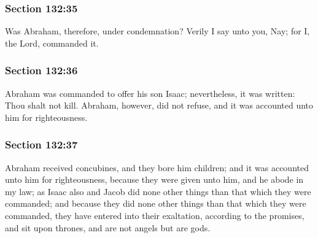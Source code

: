 	\subsubsection{Section 132:35} %
		\label{DC132-35}

		Was Abraham, therefore, under condemnation? Verily I say unto you, Nay; for I, the Lord, commanded it.


	\subsubsection{Section 132:36} %
		\label{DC132-36}

		Abraham was commanded to offer his son Isaac; nevertheless, it was written: Thou shalt not kill. Abraham, however, did not refuse, and it was accounted unto him for righteousness.


	\subsubsection{Section 132:37} %
		\label{DC132-37}

		Abraham received concubines, and they bore him children; and it was accounted unto him for righteousness, because they were given unto him, and he abode in my law; as Isaac also and Jacob did none other things than that which they were commanded; and because they did none other things than that which they were commanded, they have entered into their exaltation, according to the promises, and sit upon thrones, and are not angels but are gods.

